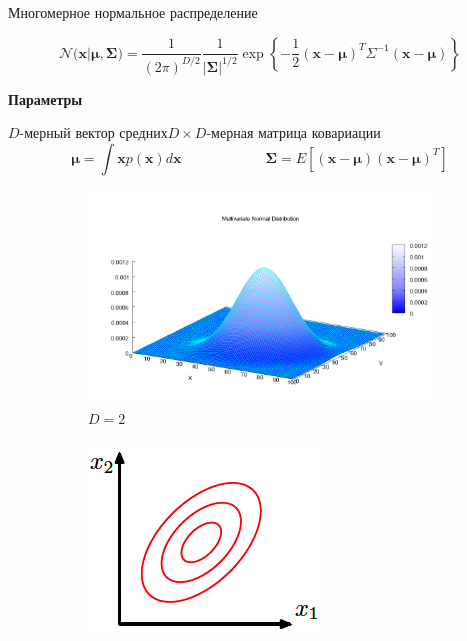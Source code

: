 \documentclass[10pt]{beamer}
\begin{document}
\begin{frame}{Многомерное нормальное распределение}

\[
\mathcal{N(\mathbf{x} | \mathbf{\mu}, \mathbf{\Sigma}}) = \frac{1}{(2 \pi)^{D/2}} \frac{1}{|\mathbf{\Sigma}|^{1/2}} \exp \left\{-\frac{1}{2}(\mathbf{x} - \mathbf{\mu})^T \Sigma^{-1} (\mathbf{x} - \mathbf{\mu})\right\}
\]

\vspace{0.7em}
\begin{center}
{\bf Параметры}
\end{center}
\quad${D}$-мерный вектор средних\qquad$D \times D$-мерная матрица ковариации 
\[
\mathbf{\mu} = \int \mathbf{x} p({\mathbf{x}}) d\mathbf{x}
\qquad\qquad\qquad
\mathbf{\Sigma} = E[(\mathbf{x} - \mathbf{\mu})(\mathbf{x} - \mathbf{\mu})^T]
\]
\begin{figure}
        \centering
        \begin{subfigure}[b]{0.23\textwidth}
                \includegraphics[width=\textwidth]{images/multi.png}
                \caption{$D = 2$}                
        \end{subfigure}    
        \begin{subfigure}[b]{0.23\textwidth}
                \includegraphics[width=\textwidth]{images/gnormal.png}

\end{subfigure}
\end{figure}
\end{frame}
\end{document}
